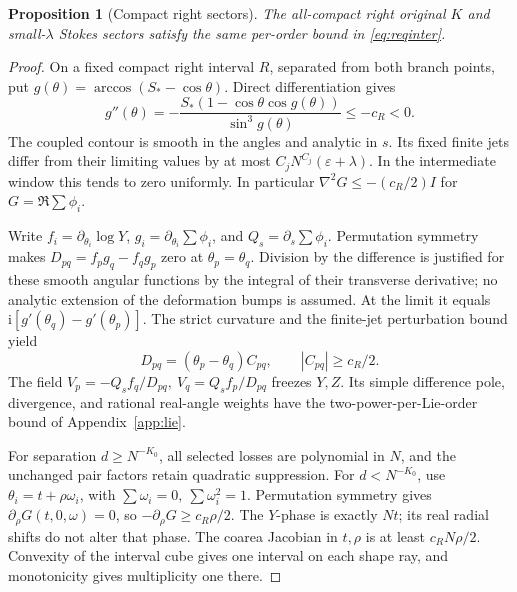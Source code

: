 \documentclass[11pt]{article}
\numberwithin{equation}{section}
\newtheorem{proposition}[theorem]{Proposition}
\theoremstyle{definition}
\newcommand{\ii}{\mathrm i}
\newcommand{\eps}{\varepsilon}
\begin{document}
\begin{proposition}[Compact right sectors]\label{prop:compactR}
The all-compact right original \(K\) and small-\(\lambda\) Stokes
sectors satisfy the same per-order bound in \eqref{eq:reqinter}.
\end{proposition}
\begin{proof}
On a fixed compact right interval \(R\), separated from both branch
points, put \(g(\theta)=\arccos(S_*-\cos\theta)\). Direct differentiation
gives
\[
 g''(\theta)=-\frac{S_*(1-\cos\theta\cos g(\theta))}{\sin^3g(\theta)}
            \le-c_R<0 .
\]
The coupled contour is smooth in the angles and analytic in \(s\).
Its fixed finite jets differ from their limiting values by at most
\(C_jN^{C_j}(\eps+\lambda)\). In the intermediate window this
tends to zero uniformly. In particular
\(\nabla^2 G\le-(c_R/2)I\) for \(G=\Re\sum\phi_i\).

Write \(f_i=\partial_{\theta_i}\log Y\), \(g_i=\partial_{\theta_i}\sum\phi_i\),
and \(Q_s=\partial_s\sum\phi_i\). Permutation symmetry makes
\(D_{pq}=f_pg_q-f_qg_p\) zero at \(\theta_p=\theta_q\).
Division by the difference is justified for these smooth angular
functions by the integral of their transverse derivative; no analytic
extension of the deformation bumps is assumed.
At the limit it equals \(\ii[g'(\theta_q)-g'(\theta_p)]\).
The strict curvature and the finite-jet perturbation bound yield
\[
 D_{pq}=(\theta_p-\theta_q)C_{pq},\qquad |C_{pq}|\ge c_R/2 .
\]
The field
\(V_p=-Q_sf_q/D_{pq},\ V_q=Q_sf_p/D_{pq}\)
freezes \(Y,Z\). Its simple difference pole, divergence, and
rational real-angle weights have the two-power-per-Lie-order
bound of Appendix~\ref{app:lie}.

For separation \(d\ge N^{-K_0}\), all selected losses are polynomial
in \(N\), and the unchanged pair factors retain quadratic suppression.
For \(d<N^{-K_0}\), use \(\theta_i=t+\rho\omega_i\), with
\(\sum\omega_i=0,\ \sum\omega_i^2=1\).
Permutation symmetry gives \(\partial_\rho G(t,0,\omega)=0\),
so \(-\partial_\rho G\ge c_R\rho/2\).
The \(Y\)-phase is exactly \(Nt\); its real radial shifts do not
alter that phase. The coarea Jacobian in \(t,\rho\) is at least
\(c_RN\rho/2\). Convexity of the interval cube gives one interval
on each shape ray, and monotonicity gives multiplicity one there.


\end{proof}
\end{document}
